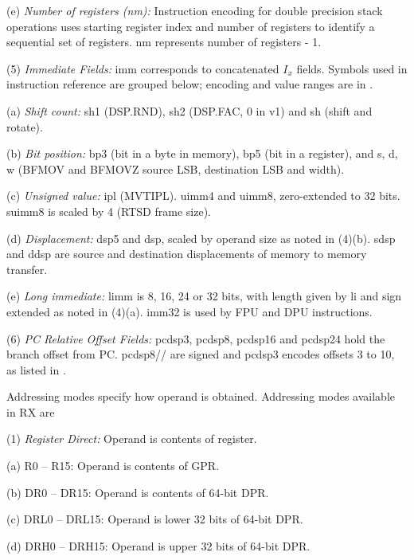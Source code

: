     (e) \emph{Number of registers (nm):} %
    Instruction encoding for double precision stack operations uses starting register index and 
    number of registers to identify a sequential set of registers. nm represents number of 
    registers - 1.

\levelone    
(5) \emph{Immediate Fields:} %
imm corresponds to concatenated $I_x$ fields. Symbols used in instruction reference are grouped 
below; encoding and value ranges are in .

    \leveltwo
    (a) \emph{Shift count:} %
    sh1 (DSP.RND), sh2 (DSP.FAC, 0 in v1) and sh (shift and rotate).

    (b) \emph{Bit position:} %
    bp3 (bit in a byte in memory), bp5 (bit in a register), and s, d, w (BFMOV and BFMOVZ source LSB, 
    destination LSB and width).

    (c) \emph{Unsigned value:} %
    ipl (MVTIPL). uimm4 and uimm8, zero-extended to 32 bits. suimm8 is scaled by 4 (RTSD frame size).

    (d) \emph{Displacement:} %
    dsp5 and dsp, scaled by operand size as noted in (4)(b). sdsp and ddsp are source and destination 
    displacements of memory to memory transfer.

    (e) \emph{Long immediate:} %
    limm is 8, 16, 24 or 32 bits, with length given by li and sign extended as noted in (4)(a). imm32 is 
    used by FPU and DPU instructions.

\levelone
(6) \emph{PC Relative Offset Fields:} %
pcdsp3, pcdsp8, pcdsp16 and pcdsp24 hold the branch offset from PC. pcdsp8// 
are signed and pcdsp3 encodes offsets 3 to 10, as listed in .



\SOPNoteBody

Addressing modes specify how operand is obtained. Addressing modes available in RX are

(1) \emph{Register Direct:} %
Operand is contents of register.

    \leveltwo
    (a) R0 -- R15: Operand is contents of GPR.

    (b) DR0 -- DR15: Operand is contents of 64-bit DPR.

    (c) DRL0 -- DRL15: Operand is lower 32 bits of 64-bit DPR.

    (d) DRH0 -- DRH15: Operand is upper 32 bits of 64-bit DPR.

